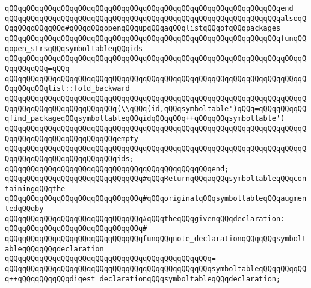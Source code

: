 \verb|qQQqqQQqqQQqqQQqqQQqqQQqqQQqqQQqqQQqqQQqqQQqqQQqqQQqqQQqqQQqqQQqend|\newline
\newline
\verb|qQQqqQQqqQQqqQQqqQQqqQQqqQQqqQQqqQQqqQQqqQQqqQQqqQQqqQQqqQQqqQQqalsoqQQqqQQqqQQqqQQq#qQQqqQQqopenqQQqupqQQqaqQQqlistqQQqofqQQqpackages|\newline
\verb|qQQqqQQqqQQqqQQqqQQqqQQqqQQqqQQqqQQqqQQqqQQqqQQqqQQqqQQqqQQqqQQqfunqQQqopen_strsqQQqsymboltableqQQqids|\newline
\verb|qQQqqQQqqQQqqQQqqQQqqQQqqQQqqQQqqQQqqQQqqQQqqQQqqQQqqQQqqQQqqQQqqQQqqQQqqQQqqQQq=qQQq|\newline
\verb|qQQqqQQqqQQqqQQqqQQqqQQqqQQqqQQqqQQqqQQqqQQqqQQqqQQqqQQqqQQqqQQqqQQqqQQqqQQqqQQqlist::fold_backward|\newline
\verb|qQQqqQQqqQQqqQQqqQQqqQQqqQQqqQQqqQQqqQQqqQQqqQQqqQQqqQQqqQQqqQQqqQQqqQQqqQQqqQQqqQQqqQQqqQQqqQQq(\\qQQq(id,qQQqsymboltable')qQQq=qQQqqQQqqQQqfind_packageqQQqsymboltableqQQqidqQQqqQQq++qQQqqQQqsymboltable')|\newline
\verb|qQQqqQQqqQQqqQQqqQQqqQQqqQQqqQQqqQQqqQQqqQQqqQQqqQQqqQQqqQQqqQQqqQQqqQQqqQQqqQQqqQQqqQQqqQQqqQQqempty|\newline
\verb|qQQqqQQqqQQqqQQqqQQqqQQqqQQqqQQqqQQqqQQqqQQqqQQqqQQqqQQqqQQqqQQqqQQqqQQqqQQqqQQqqQQqqQQqqQQqqQQqids;|\newline
\verb|qQQqqQQqqQQqqQQqqQQqqQQqqQQqqQQqqQQqqQQqqQQqqQQqend;|\newline
\newline
\newline
\verb|qQQqqQQqqQQqqQQqqQQqqQQqqQQqqQQq#qQQqReturnqQQqaqQQqsymboltableqQQqcontainingqQQqthe|\newline
\verb|qQQqqQQqqQQqqQQqqQQqqQQqqQQqqQQq#qQQqoriginalqQQqsymboltableqQQqaugmentedqQQqby|\newline
\verb|qQQqqQQqqQQqqQQqqQQqqQQqqQQqqQQq#qQQqtheqQQqgivenqQQqdeclaration:|\newline
\verb|qQQqqQQqqQQqqQQqqQQqqQQqqQQqqQQq#|\newline
\verb|qQQqqQQqqQQqqQQqqQQqqQQqqQQqqQQqfunqQQqnote_declarationqQQqqQQqsymboltableqQQqqQQqdeclaration|\newline
\verb|qQQqqQQqqQQqqQQqqQQqqQQqqQQqqQQqqQQqqQQqqQQqqQQq=|\newline
\verb|qQQqqQQqqQQqqQQqqQQqqQQqqQQqqQQqqQQqqQQqqQQqqQQqsymboltableqQQqqQQqqQQq++qQQqqQQqqQQqdigest_declarationqQQqsymboltableqQQqdeclaration;|\newline
\newline
